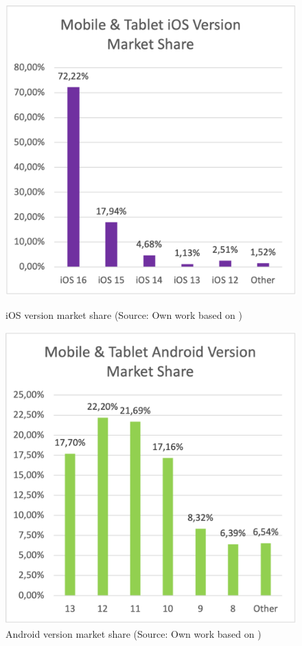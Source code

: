 \begin{figure}[hb]
  \begin{minipage}{.47\textwidth}
    \includegraphics[width=\textwidth]{img/ios_ver_market_share}
    \caption{iOS version market share (Source: Own work based on \cite{statcounter_ios_version_market})}
    \label{fig:ios_versions}
  \end{minipage}
  \hfill
  \begin{minipage}{.47\textwidth}
    \includegraphics[width=\textwidth]{img/android_ver_market_share}
    \caption{Android version market share (Source: Own work based on \cite{statcounter_android_version_market})}
    \label{fig:android_versions}
  \end{minipage}
\end{figure}

